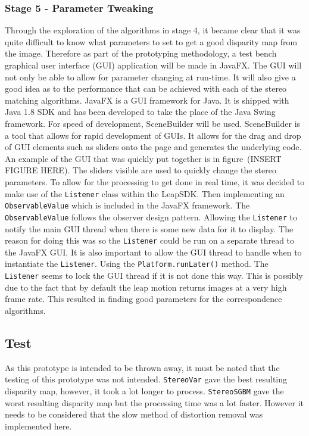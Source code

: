 \documentclass[11pt,oneside]{report}
\newcommand\code[1]{\texttt{#1}}
\begin{document}
		\subsubsection{Stage 5 - Parameter Tweaking}
		Through the exploration of the algorithms in stage 4, it became clear that it was quite difficult to know what parameters to set to get a good disparity map from the image.
		Therefore as part of the prototyping methodology, a test bench graphical user interface (GUI) application will be made in JavaFX.
		The GUI will not only be able to allow for parameter changing at run-time.
		It will also give a good idea as to the performance that can be achieved with each of the stereo matching algorithms.
		JavaFX is a GUI framework for Java.
		It is shipped with Java 1.8 SDK and has been developed to take the place of the Java Swing framework.
		For speed of development, SceneBuilder will be used.
		SceneBuilder is a tool that allows for rapid development of GUIs.
		It allows for the drag and drop of GUI elements such as sliders onto the page and generates the underlying code.
		An example of the GUI that was quickly put together is in figure~(INSERT FIGURE HERE).
		The sliders visible are used to quickly change the stereo parameters.
		To allow for the processing to get done in real time, it was decided to make use of the \code{Listener} class within the LeapSDK.
		Then implementing an \code{ObservableValue} which is included in the JavaFX framework.
		The \code{ObservableValue} follows the observer design pattern.
		Allowing the \code{Listener} to notify the main GUI thread when there is some new data for it to display.
		The reason for doing this was so the \code{Listener} could be run on a separate thread to the JavaFX GUI.
		It is also important to allow the GUI thread to handle when to instantiate the \code{Listener}.
		Using the \code{Platform.runLater()} method.
		The \code{Listener} seems to lock the GUI thread if it is not done this way.
		This is possibly due to the fact that by default the leap motion returns images at a very high frame rate.
		This resulted in finding good parameters for the correspondence algorithms.
		\subsection{Test}
		As this prototype is intended to be thrown away, it must be noted that the testing of this prototype was not intended.
		\code{StereoVar} gave the best resulting disparity map, however, it took a lot longer to process.
		\code{StereoSGBM} gave the worst resulting disparity map but the processing time was a lot faster.
		However it needs to be considered that the slow method of distortion removal was implemented here.
\end{document}
